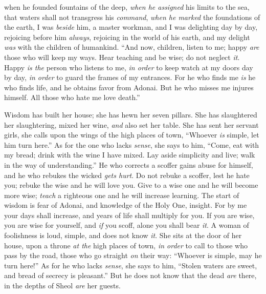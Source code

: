 \begin{biblechapter}
when he founded fountains of the deep,
\verse \textit{when he assigned} his limits to the sea, 
that waters shall not transgress his \textit{command}, 
\textit{when he marked} the foundations of the earth,
\verse I was \textit{beside} him, a master workman, 
and I was delighting day by day, 
rejoicing before him \textit{always},
\verse rejoicing in the world of his earth, 
and my delight \textit{was} with the children of humankind.
 “And now, children, listen to me; 
happy \textit{are} those who will keep my ways.
\verse Hear teaching and be wise; 
do not neglect \textit{it}.
\verse Happy \textit{is the} person who listens to me, 
\textit{in order} to keep watch at my doors day by day, 
\textit{in order} to guard the frames of my entrances.
\verse For he who finds me \textit{is} he who finds life, 
and he obtains favor from Adonai.
\verse But he who misses me injures himself. 
All those who hate me love death.”
\end{biblechapter}

\begin{biblechapter} %
 Wisdom has built her house; 
she has hewn her seven pillars.
\verse She has slaughtered her slaughtering, mixed her wine, 
\textit{and} also set her table.
\verse She has sent her servant girls, she calls 
upon the wings of the high places of town,
\verse “Whoever \textit{is} simple, let him turn here.” 
As for the one who lacks \textit{sense}, she says to him,
\verse “Come, eat with my bread; 
drink with the wine I have mixed.
\verse Lay aside simplicity and live; 
walk in the way of understanding.”
\verse He who corrects a scoffer gains abuse for himself, 
and he who rebukes the wicked \textit{gets hurt}.
\verse Do not rebuke a scoffer, lest he hate you; 
rebuke the wise and he will love you.
\verse Give to a wise one and he will become more wise; 
\textit{teach} a righteous one and he will increase learning.
 The start of wisdom is fear of Adonai, 
and knowledge of the Holy One, insight.
\verse For by me your days shall increase, 
and years of life shall multiply for you.
\verse If you are wise, you are wise for yourself, 
and \textit{if} you scoff, alone you shall bear \textit{it}.
\verse A woman of foolishness is loud, 
simple, and does not know \textit{it}.
\verse She sits at the door of her house, 
upon a throne \textit{at the} high places of town,
\verse \textit{in order} to call to those who pass by the road, 
those who go straight \textit{on} their way:
\verse “Whoever is simple, may he turn here!” 
As for he who lacks \textit{sense}, she says to him,
\verse “Stolen waters are sweet, 
and bread of secrecy is pleasant.”
\verse But he does not know that the dead \textit{are} there, 
in the depths of Sheol \textit{are} her guests.
\end{biblechapter}

